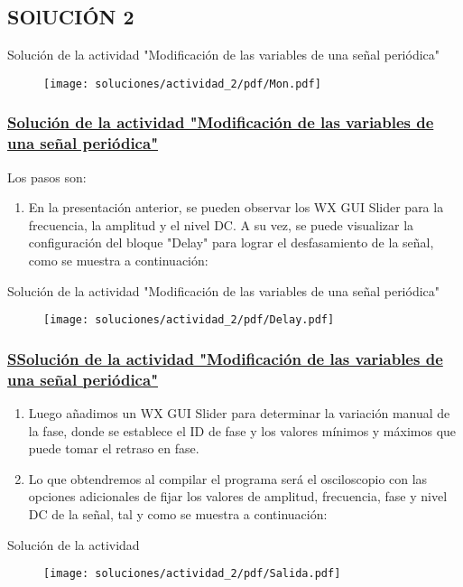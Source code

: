 \subsection{SOlUCIÓN 2}
	
	\begin{frame}{Solución de la actividad "Modificación de las variables de una señal periódica"}
	\begin{figure}[H]
		\vspace{-3mm}
		\centering 
		\texttt{[image: soluciones/actividad\_2/pdf/Mon.pdf]}
		\end{figure}
	\end{frame}
	
	\begin{frame}
	\frametitle{\underline{\textbf{Solución de la actividad "Modificación de las variables de una señal periódica"}}}

	Los pasos son:
	\begin{enumerate}[1.]

	\item{En la presentación anterior, se pueden observar los WX GUI Slider para la frecuencia, la amplitud y el nivel DC. A su vez, se puede visualizar la configuración del bloque "Delay" para lograr el desfasamiento de la señal, como se muestra a continuación:}\\
	
	\end{enumerate}
	\end{frame}
	
	\begin{frame}{Solución de la actividad "Modificación de las variables de una señal periódica"}
	\begin{figure}[H]
		\vspace{-3mm}
		\centering
		\texttt{[image: soluciones/actividad\_2/pdf/Delay.pdf]}
		\end{figure}
	\end{frame}

	\begin{frame}
	\frametitle{\underline{\textbf{SSolución de la actividad "Modificación de las variables de una señal periódica"}}}
	\begin{enumerate}[2.]
	
	\item{Luego añadimos un WX GUI Slider para determinar la variación manual de la fase, donde se establece el ID de fase y los valores mínimos y máximos que puede tomar el retraso en fase.}\\
	\item{Lo que obtendremos al compilar el programa será el osciloscopio con las opciones adicionales de fijar los valores de amplitud, frecuencia, fase y nivel DC de la señal, tal y como se muestra a continuación:}\\
	
	\end{enumerate}
	\end{frame}


	\begin{frame}{Solución de la actividad}
	\begin{figure}[H]
		\vspace{-3mm}
		\centering
		\texttt{[image: soluciones/actividad\_2/pdf/Salida.pdf]}
		\end{figure}
	\end{frame}
	
	
